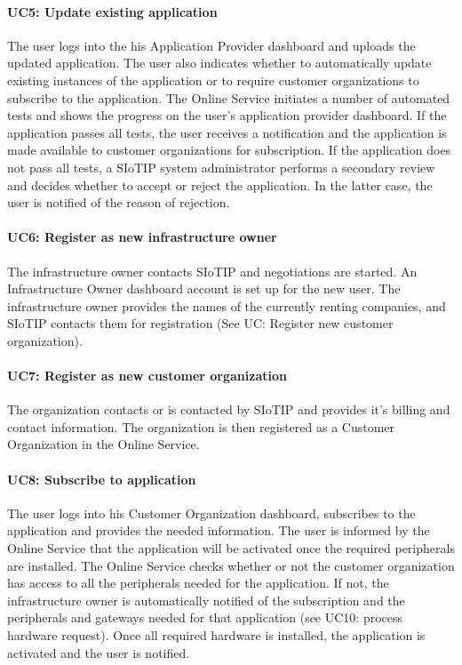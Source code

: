 \documentclass[english]{sareport}
\begin{document}
\paragraph{UC5: Update existing application}
The user logs into the his Application Provider dashboard and uploads the updated application. The user also indicates whether to automatically update existing instances of the application or to require customer organizations to subscribe to the application. The Online Service initiates a number of automated tests and shows the progress on the user's application provider dashboard. If the application passes all tests, the user receives a notification and the application is made available to customer organizations for subscription. If the application does not pass all tests, a SIoTIP system administrator performs a secondary review and decides whether to accept or reject the application. In the latter case, the user is notified of the reason of rejection.

\paragraph{UC6: Register as new infrastructure owner}
The infrastructure owner contacts SIoTIP and negotiations are started. An Infrastructure Owner dashboard account is set up for the new user. The infrastructure owner provides the names of the currently renting companies, and SIoTIP contacts them for registration (See UC: Register new customer organization).

\paragraph{UC7: Register as new customer organization}
The organization contacts or is contacted by SIoTIP and provides it's billing and contact information. The organization is then registered as a Customer Organization in the Online Service.

\paragraph{UC8: Subscribe to application}
The user logs into his Customer Organization dashboard, subscribes to the application and provides the needed information. The user is informed by the Online Service that the application will be activated once the required peripherals are installed. The Online Service checks whether or not the customer organization has access to all the peripherals needed for the application. If not, the infrastructure owner is automatically notified of the subscription and the peripherals and gateways needed for that application (see UC10: process hardware request). Once all required hardware is installed, the application is activated and the user is notified.
\end{document}
